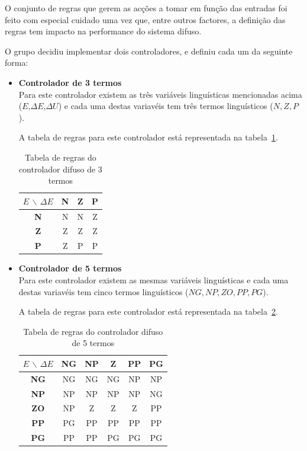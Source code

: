 \documentclass{article}
\begin{document}
O conjunto de regras que gerem as acções a tomar em função das entradas foi feito com especial cuidado uma vez que, entre outros factores, a definição das regras tem impacto na performance do sistema difuso.

O grupo decidiu implementar dois controladores, e definiu cada um da seguinte forma:
\begin{itemize}
\item \textbf{Controlador de 3 termos} \\
Para este controlador existem as três variáveis linguísticas mencionadas acima ($E$,$\Delta E$,$\Delta U$) e cada uma destas variavéis tem três termos linguísticos (${N,Z,P}$).

A tabela de regras para este controlador está representada na tabela~\ref{3_terms_fuzzy}.

\begin{table}[!h]
\centering
	\caption{Tabela de regras do controlador difuso de 3 termos}
	\label{3_terms_fuzzy}
	\begin{tabular}{|c|c|c|c|}
	\hline 
	$E$ $\backslash$ $\Delta E$ & \textbf{N} & \textbf{Z} & \textbf{P} \\ 
	\hline 
	\textbf{N} & N & N & Z \\ 
	\hline 
	\textbf{Z} & Z & Z & Z \\ 
	\hline 
	\textbf{P} & Z & P & P \\ 
	\hline 
	\end{tabular} 
\end{table}


\item \textbf{Controlador de 5 termos} \\
Para este controlador existem as mesmas variáveis linguísticas e cada uma destas variavéis tem cinco termos linguísticos (${NG,NP,ZO,PP,PG}$).

A tabela de regras para este controlador está representada na tabela~\ref{5_terms_fuzzy}.

\begin{table}[!h]
\centering
	\caption{Tabela de regras do controlador difuso de 5 termos}
	\label{5_terms_fuzzy}
	\begin{tabular}{|c|c|c|c|c|c|}
	\hline 
	$E$ $\backslash$ $\Delta E$ & \textbf{NG} & \textbf{NP} & \textbf{Z} & \textbf{PP} & \textbf{PG} \\ 
	\hline 
	\textbf{NG} & NG & NG & NG & NP & NP \\ 
	\hline 
	\textbf{NP} & NP & NP & NP & NP & NG \\ 
	\hline 
	\textbf{ZO} & NP & Z & Z & Z & PP \\ 
	\hline
	\textbf{PP} & PG & PP & PP & PP & PP \\ 
	\hline 
	\textbf{PG} & PP & PP & PG & PG & PG \\ 
	\hline 
	\end{tabular} 
\end{table}
\end{itemize}
\end{document}
